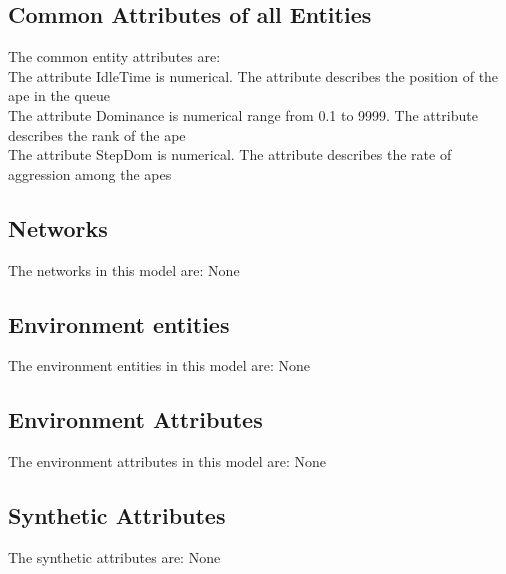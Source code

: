 \documentclass{article}
\begin{document}
\subsection{Common Attributes of all Entities}
The common entity attributes are:\\
The attribute {\color{blue}IdleTime} is {\color{green}numerical}. The attribute describes the position of the ape in the queue\\
The attribute {\color{blue}Dominance} is {\color{green}numerical range} from 0.1 to 9999. The attribute describes the rank of the ape\\                     
The attribute {\color{blue}StepDom} is {\color{green}numerical}. The attribute describes the rate of aggression among the apes\\
\subsection{Networks}
The networks in this model are: None\\  
\subsection{Environment entities}           
The environment entities in this model are: None
\subsection{Environment Attributes}                      
The environment attributes in this model are: None  
\subsection{Synthetic Attributes}
The synthetic attributes are: None     
\end{document}
